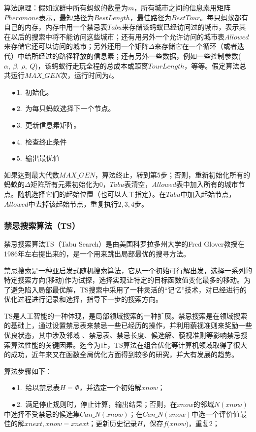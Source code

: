 算法原理：假如蚁群中所有蚂蚁的数量为$m$，所有城市之间的信息素用矩阵$Pheromone$表示，最短路径为$BestLength$，最佳路径为$BestTour$。每只蚂蚁都有自己的内存，内存中用一个禁忌表$Tabu$来存储该蚂蚁已经访问过的城市，表示其在以后的搜索中将不能访问这些城市；还有用另外一个允许访问的城市表$Allowed$来存储它还可以访问的城市；另外还用一个矩阵$\Delta$来存储它在一个循环（或者迭代）中给所经过的路径释放的信息素；还有另外一些数据，例如一些控制参数($\alpha,\ \beta,\ \rho,\ Q$)，该蚂蚁行走玩全程的总成本或距离$TourLength$，等等。假定算法总共运行$MAX\_GEN$次，运行时间为$t$。

$\quad \bullet$1.\ 初始化。

$\quad \bullet$2.\ 为每只蚂蚁选择下一个节点。

$\quad \bullet$3.\ 更新信息素矩阵。

$\quad \bullet$4.\ 检查终止条件

$\quad \bullet$5.\ 输出最优值

如果达到最大代数$MAX\_GEN$，算法终止，转到第5步；否则，重新初始化所有的蚂蚁的$\Delta$矩阵所有元素初始化为$0$，$Tabu$表清空，$Allowed$表中加入所有的城市节点。随机选择它们的起始位置（也可以人工指定）。在$Tabu$中加入起始节点，$Allowed$中去掉该起始节点，重复执行$2,3,4$步。
\subsubsection{禁忌搜索算法（TS）}
禁忌搜索算法TS（Tabu Search）\cite{he2022hybrid}是由美国科罗拉多州大学的Fred Glover教授在1986年左右提出来的，是一个用来跳出局部最优的搜寻方法。

禁忌搜索是一种亚启发式随机搜索算法，它从一个初始可行解出发，选择一系列的特定搜索方向(移动)作为试探，选择实现让特定的目标函数值变化最多的移动。为了避免陷入局部最优解，TS搜索中采用了一种灵活的“记忆”技术，对已经进行的优化过程进行记录和选择，指导下一步的搜索方向。

TS是人工智能的一种体现，是局部领域搜索的一种扩展。禁忌搜索是在领域搜索的基础上，通过设置禁忌表来禁忌一些已经历的操作，并利用藐视准则来奖励一些优良状态，其中涉及邻域 、禁忌表、禁忌长度、候选解、藐视准则等影响禁忌搜索算法性能的关键因素。迄今为止，TS算法在组合优化等计算机领域取得了很大的成功，近年来又在函数全局优化方面得到较多的研究，并大有发展的趋势。

算法步骤如下：

$\quad \bullet$1.\ 给以禁忌表$H=\Phi$，并选定一个初始解$xnow$；

$\quad \bullet$2.\ 满足停止规则时，停止计算，输出结果；否则，在$xnow$的邻域$N(xnow)$中选择不受禁忌的候选集$Can\_N(xnow)$；在$Can\_N(xnow)$中选一个评价值最佳的解$xnext,xnow=xnext$；更新历史记录$H$，保存$f(xnow$)，重复2；

